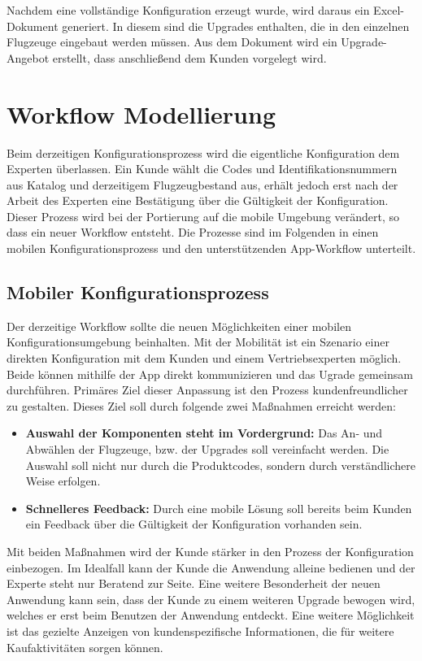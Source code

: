 Nachdem eine vollständige Konfiguration erzeugt wurde, wird daraus ein Excel-Dokument generiert. In diesem sind die Upgrades enthalten, die in den einzelnen Flugzeuge eingebaut werden müssen. Aus dem Dokument wird ein Upgrade-Angebot erstellt, dass anschließend dem Kunden vorgelegt wird.

\section{Workflow Modellierung}
Beim derzeitigen Konfigurationsprozess wird die eigentliche Konfiguration dem Experten überlassen. Ein Kunde wählt die Codes und Identifikationsnummern aus Katalog und derzeitigem Flugzeugbestand aus, erhält jedoch erst nach der Arbeit des Experten eine Bestätigung über die Gültigkeit der Konfiguration. Dieser Prozess wird bei der Portierung auf die mobile Umgebung verändert, so dass ein neuer Workflow entsteht. Die Prozesse sind im Folgenden in einen mobilen Konfigurationsprozess und den unterstützenden App-Workflow unterteilt.
\subsection{Mobiler Konfigurationsprozess}
Der derzeitige Workflow sollte die neuen Möglichkeiten einer mobilen Konfigurationsumgebung beinhalten. Mit der Mobilität ist ein Szenario einer direkten Konfiguration mit dem Kunden und einem Vertriebsexperten möglich. Beide können mithilfe der App direkt kommunizieren und das Ugrade gemeinsam durchführen. 
Primäres Ziel dieser Anpassung ist den Prozess kundenfreundlicher zu gestalten. Dieses Ziel soll durch folgende zwei Maßnahmen erreicht werden: \par

\begin{itemize}
        \item \textbf{Auswahl der Komponenten steht im Vordergrund:} Das An- und Abwählen der Flugzeuge, bzw. der Upgrades soll vereinfacht werden. Die Auswahl soll nicht nur durch die Produktcodes, sondern durch verständlichere Weise erfolgen. 
        \item \textbf{Schnelleres Feedback:} Durch eine mobile Lösung soll bereits beim Kunden ein Feedback über die Gültigkeit der Konfiguration vorhanden sein.
\end{itemize}

Mit beiden Maßnahmen wird der Kunde stärker in den Prozess der Konfiguration einbezogen. Im Idealfall kann der Kunde die Anwendung alleine bedienen und der Experte steht nur Beratend zur Seite. Eine weitere Besonderheit der neuen Anwendung kann sein, dass der Kunde zu einem weiteren Upgrade bewogen wird, welches er erst beim Benutzen der Anwendung entdeckt. Eine weitere Möglichkeit ist das gezielte Anzeigen von kundenspezifische Informationen, die für weitere Kaufaktivitäten sorgen können. \par

